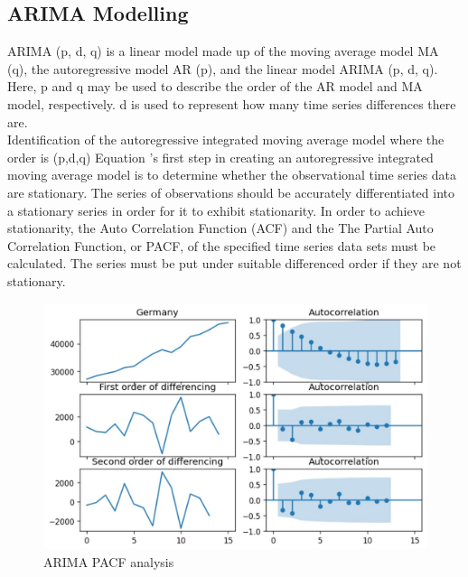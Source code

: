 \documentclass[conference]{IEEEtran}
\begin{document}
\subsection{ARIMA Modelling}
ARIMA (p, d, q) is a linear model made up of the moving average model MA (q), the autoregressive model AR (p),
and the linear model ARIMA (p, d, q).
Here, p and q may be used to describe the order of the AR model and MA model, respectively.
d is used to represent how many time series differences there are.
\\
Identification of the autoregressive integrated moving average model where the order is
(p,d,q)
Equation 's first step in creating an autoregressive integrated moving average model is
to determine whether the observational time series data are stationary. The series of observations should
be accurately differentiated into a stationary series in order for it to exhibit stationarity.
In order to achieve stationarity, the Auto Correlation Function (ACF) and the
The Partial Auto Correlation Function, or PACF, of the specified time series data sets must be calculated.
The series must be put under suitable differenced order if they are not stationary.
\begin{figure}[htbp]
    \centerline{\includegraphics[scale=0.41]{arimaa.jpg}}
    \caption{ARIMA PACF analysis}
\end{figure}
\end{document}
